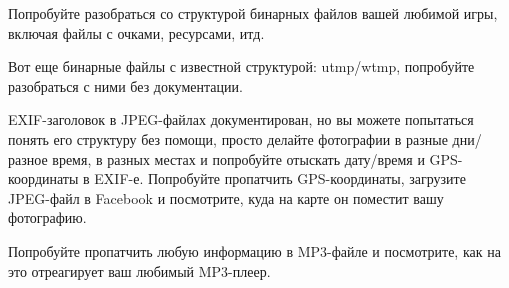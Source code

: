 
Попробуйте разобраться со структурой бинарных файлов вашей любимой игры, включая файлы с очками, ресурсами, итд.

Вот еще бинарные файлы с известной структурой: utmp/wtmp, попробуйте разобраться с ними без документации.

EXIF-заголовок в JPEG-файлах документирован, но вы можете попытаться понять его структуру без помощи, просто делайте
фотографии в разные дни/разное время, в разных местах и попробуйте отыскать дату/время и GPS-координаты в EXIF-е.
Попробуйте пропатчить GPS-координаты, загрузите JPEG-файл в Facebook и посмотрите, куда на карте он поместит вашу
фотографию.

Попробуйте пропатчить любую информацию в MP3-файле и посмотрите, как на это отреагирует ваш любимый MP3-плеер.

